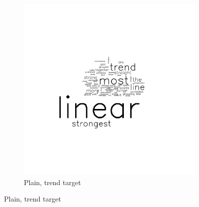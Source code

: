 \documentclass[11pt]{isuthesis}\usepackage[]{graphicx}\usepackage[]{color}
\begin{document}
\begin{figure}[ht]
\begin{subfigure}[t]{0.32\linewidth}\centering
  \caption{Plain, trend target}
  \includegraphics[width=.83\linewidth]{fig-sentiment-3}
\end{subfigure}


\end{figure}
\end{document}
